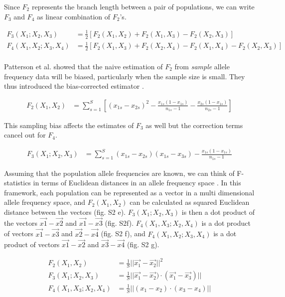 \documentclass[12pt, letterpaper]{article}
\begin{document}
Since $F_2$ represents the branch length between a pair of populations, we can write $F_3$ and $F_4$ as linear combination of $F_2$'s.

\begin{align}\label{eq:f3_f4}
F_3(X_1;X_2,X_3) &= \frac{1}{2} [F_2(X_1,X_2) + F_2(X_1,X_3) - F_2(X_2,X_3)]\nonumber\\
F_4(X_1,X_2;X_3,X_4) &= \frac{1}{2} [F_2(X_1,X_3) + F_2(X_2,X_4) - F_2(X_1,X_4) - F_2(X_2,X_3)]\nonumber\\
\end{align}

Patterson et al. showed that the naive estimation of $F_2$ from \emph{sample} allele frequency data will be biased, particularly when the sample size is small. They thus  introduced the bias-corrected estimator \cite{peter_admixture_2016, patterson_ancient_2012}.

\begin{align}\label{eq:f2_correction}
F_2(X_1,X_2) &= \sum_{s=1}^S[(x_{1s} - x_{2s})^2 - \frac{x_{1s}(1-x_{1s})}{n_{1s}-1} - \frac{x_{2s}(1-x_{1s})}{n_{2s}-1}]
\end{align}


This sampling bias affects the estimates of $F_3$ as well but the correction terms cancel out for $F_4$.

\begin{align}\label{eq:f3_correction}
F_3(X_1;X_2,X_3) &= \sum_{s=1}^S(x_{1s} - x_{2s})(x_{1s} - x_{3s}) - \frac{x_{1s}(1-x_{1s})}{n_{1s}-1}
\end{align}

Assuming that the population allele frequencies are known, we can think of F-statistics in terms of Euclidean distances in an allele frequency space \cite{oteo-garcia_geometrical_2021}. In this framework, each population can be represented as a vector in a multi dimensional allele frequency space, and $F_2(X_1, X_2)$ can be calculated as squared Euclidean distance between the vectors (fig. S2 e). $F_3(X_1;X_2,X_3)$ is then a dot product of the vectors $\Vec{x1} - \Vec{x2}$ and $\Vec{x1} - \Vec{x3}$ (fig. S2f). $F_4(X_1,X_3;X_2,X_4)$ is a dot product of vectors $\Vec{x1} - \Vec{x3}$ and $\Vec{x2} - \Vec{x4}$ (fig. S2 f), and $F_4(X_1,X_2;X_3,X_4)$ is a dot product of vectors $\Vec{x1} - \Vec{x2}$ and $\Vec{x3} - \Vec{x4}$ (fig. S2 g). 

\begin{align}\label{eq:f_geometric}
F_2(X_1,X_2) &= \frac{1}{S}||\Vec{x_{1}} - \vec{x_{2}}||^2\nonumber\\
F_3(X_1;X_2,X_3) &= \frac{1}{S}||\vec{x_{1}} - \vec{x_{2}})\cdot(\vec{x_{1}} - \vec{x_{3}})||\nonumber\\
F_4(X_1,X_3;X_2,X_4) &= \frac{1}{S}||(x_{1} - x_{2})\cdot(x_{3} - x_{4})||\nonumber\\
\end{align}
\end{document}
